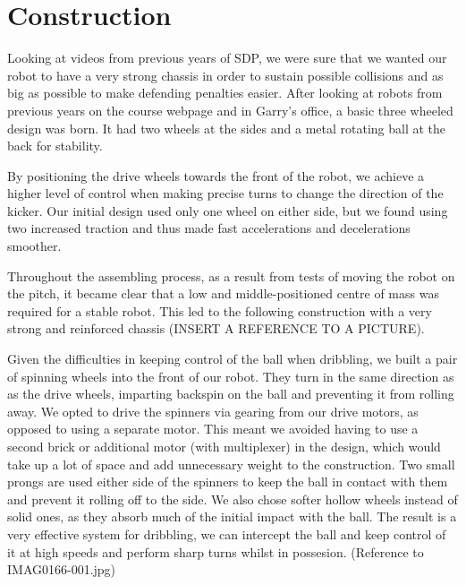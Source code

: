 \section{Construction}

Looking at videos from previous years of SDP, we were sure that we wanted our robot to have a very strong chassis in order to sustain possible collisions and as big as possible to make defending penalties easier. After looking at robots from previous years on the course webpage and in Garry's office, a basic three wheeled design was born. It had two wheels at the sides and a metal rotating ball at the back for stability.

By positioning the drive wheels towards the front of the robot, we achieve a higher level of control when making precise turns to change the direction of the kicker. Our initial design used only one wheel on either side, but we found using two increased traction and thus made fast accelerations and decelerations smoother.

Throughout the assembling process, as a result from tests of moving the robot on the pitch, it became clear that a low and middle-positioned centre of mass was required for a stable robot. This led to the following construction with a very strong and reinforced chassis (INSERT A REFERENCE TO A PICTURE). 

Given the difficulties in keeping control of the ball when dribbling, we built a pair of spinning wheels into the front of our robot. They turn in the same direction as as the drive wheels, imparting backspin on the ball and preventing it from rolling away. We opted to drive the spinners via gearing from our drive motors, as opposed to using a separate motor. This meant we avoided having to use a second brick or additional motor (with multiplexer) in the design, which would take up a lot of space and add unnecessary weight to the construction. Two small prongs are used either side of the spinners to keep the ball in contact with them and prevent it rolling off to the side. We also chose softer hollow wheels instead of solid ones, as they absorb much of the initial impact with the ball. The result is a very effective system for dribbling, we can intercept the ball and keep control of it at high speeds and perform sharp turns whilst in possesion. (Reference to IMAG0166-001.jpg)

